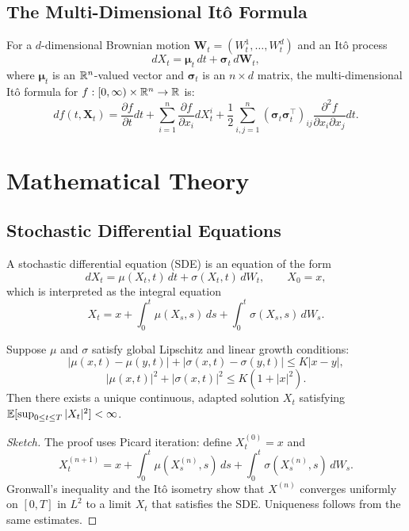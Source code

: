 \subsection{The Multi-Dimensional It\^{o} Formula}

For a \(d\)-dimensional Brownian motion \(\mathbf{W}_t = (W_t^1, \ldots, W_t^d)\) and an It\^{o} process
\[
dX_t = \boldsymbol{\mu}_t \, dt + \boldsymbol{\sigma}_t \, d\mathbf{W}_t,
\]
where \(\boldsymbol{\mu}_t\) is an \(\mathbb{R}^n\)-valued vector and \(\boldsymbol{\sigma}_t\) is an \(n \times d\) matrix, the multi-dimensional It\^{o} formula for \(f: [0,\infty) \times \mathbb{R}^n \to \mathbb{R}\) is:
\[
df(t,\mathbf{X}_t) = \frac{\partial f}{\partial t} dt + \sum_{i=1}^n \frac{\partial f}{\partial x_i} dX_t^i + \frac12 \sum_{i,j=1}^n (\boldsymbol{\sigma}_t \boldsymbol{\sigma}_t^\top)_{ij} \frac{\partial^2 f}{\partial x_i \partial x_j} dt.
\]

\section{Mathematical Theory}

\subsection{Stochastic Differential Equations}

A stochastic differential equation (SDE) is an equation of the form
\[
dX_t = \mu(X_t, t)\,dt + \sigma(X_t, t)\,dW_t, \qquad X_0 = x,
\]
which is interpreted as the integral equation
\[
X_t = x + \int_0^t \mu(X_s, s)\,ds + \int_0^t \sigma(X_s, s)\,dW_s.
\]

\begin{theorem}
Suppose \(\mu\) and \(\sigma\) satisfy global Lipschitz and linear growth conditions:
\[
|\mu(x,t) - \mu(y,t)| + |\sigma(x,t) - \sigma(y,t)| \leq K|x - y|,
\]
\[
|\mu(x,t)|^2 + |\sigma(x,t)|^2 \leq K(1 + |x|^2).
\]
Then there exists a unique continuous, adapted solution \(X_t\) satisfying \(\mathbb{E}[\sup_{0 \leq t \leq T} |X_t|^2] < \infty\).
\end{theorem}

\begin{proof}[Sketch]
The proof uses Picard iteration: define \(X_t^{(0)} = x\) and
\[
X_t^{(n+1)} = x + \int_0^t \mu(X_s^{(n)}, s)\,ds + \int_0^t \sigma(X_s^{(n)}, s)\,dW_s.
\]
Gronwall's inequality and the It\^{o} isometry show that \(X^{(n)}\) converges uniformly on \([0,T]\) in \(L^2\) to a limit \(X_t\) that satisfies the SDE. Uniqueness follows from the same estimates.
\end{proof}

